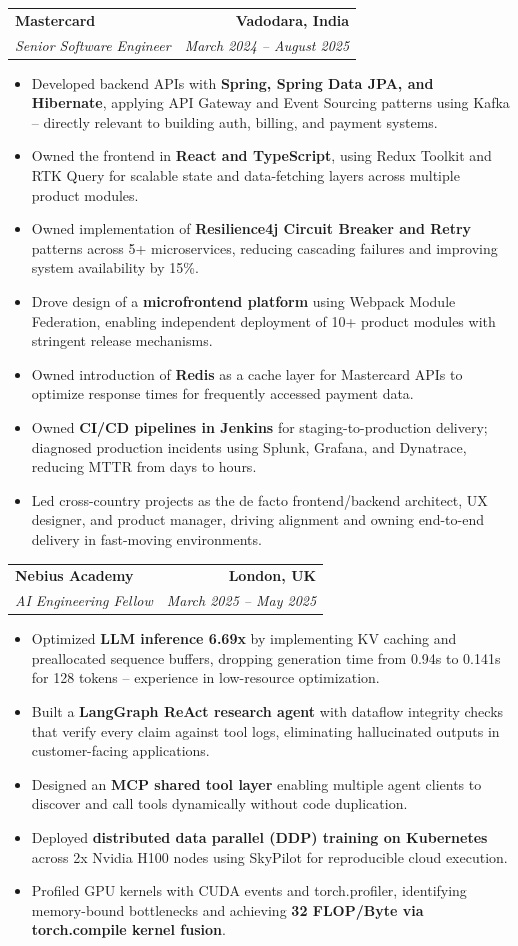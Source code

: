 \documentclass[letterpaper,11pt]{article}
\makeatletter
\newcommand{\resumeItem}[1]{
  \item\small{
    {#1 \vspace{-3pt}}
  }
}
\newcommand{\resumeSubheading}[4]{
  \vspace{-3pt}\item
    \begin{tabular*}{1.0\textwidth}[t]{l@{\extracolsep{\fill}}r}
      \textbf{#1} & \textbf{\small #2} \\
      \textit{\small#3} & \textit{\small #4} \\
    \end{tabular*}\vspace{-7pt}
}
\newcommand{\resumeItemListStart}{\begin{itemize}}
\newcommand{\resumeItemListEnd}{\end{itemize}\vspace{0pt}}
\makeatother
\begin{document}
    \resumeSubheading
      {Mastercard}{Vadodara, India}
      {Senior Software Engineer}{March 2024 -- August 2025}
      \resumeItemListStart
        \resumeItem{Developed backend APIs with \textbf{Spring, Spring Data JPA, and Hibernate}, applying API Gateway and Event Sourcing patterns using Kafka -- directly relevant to building auth, billing, and payment systems.}
        \resumeItem{Owned the frontend in \textbf{React and TypeScript}, using Redux Toolkit and RTK Query for scalable state and data-fetching layers across multiple product modules.}
        \resumeItem{Owned implementation of \textbf{Resilience4j Circuit Breaker and Retry} patterns across 5+ microservices, reducing cascading failures and improving system availability by 15\%.}
        \resumeItem{Drove design of a \textbf{microfrontend platform} using Webpack Module Federation, enabling independent deployment of 10+ product modules with stringent release mechanisms.}
        \resumeItem{Owned introduction of \textbf{Redis} as a cache layer for Mastercard APIs to optimize response times for frequently accessed payment data.}
        \resumeItem{Owned \textbf{CI/CD pipelines in Jenkins} for staging-to-production delivery; diagnosed production incidents using Splunk, Grafana, and Dynatrace, reducing MTTR from days to hours.}
        \resumeItem{Led cross-country projects as the de facto frontend/backend architect, UX designer, and product manager, driving alignment and owning end-to-end delivery in fast-moving environments.}
      \resumeItemListEnd

    \resumeSubheading
      {Nebius Academy}{London, UK}
      {AI Engineering Fellow}{March 2025 -- May 2025}
      \resumeItemListStart
        \resumeItem{Optimized \textbf{LLM inference 6.69x} by implementing KV caching and preallocated sequence buffers, dropping generation time from 0.94s to 0.141s for 128 tokens -- experience in low-resource optimization.}
        \resumeItem{Built a \textbf{LangGraph ReAct research agent} with dataflow integrity checks that verify every claim against tool logs, eliminating hallucinated outputs in customer-facing applications.}
        \resumeItem{Designed an \textbf{MCP shared tool layer} enabling multiple agent clients to discover and call tools dynamically without code duplication.}
        \resumeItem{Deployed \textbf{distributed data parallel (DDP) training on Kubernetes} across 2x Nvidia H100 nodes using SkyPilot for reproducible cloud execution.}
        \resumeItem{Profiled GPU kernels with CUDA events and torch.profiler, identifying memory-bound bottlenecks and achieving \textbf{32 FLOP/Byte via torch.compile kernel fusion}.}
      \resumeItemListEnd
\end{document}
